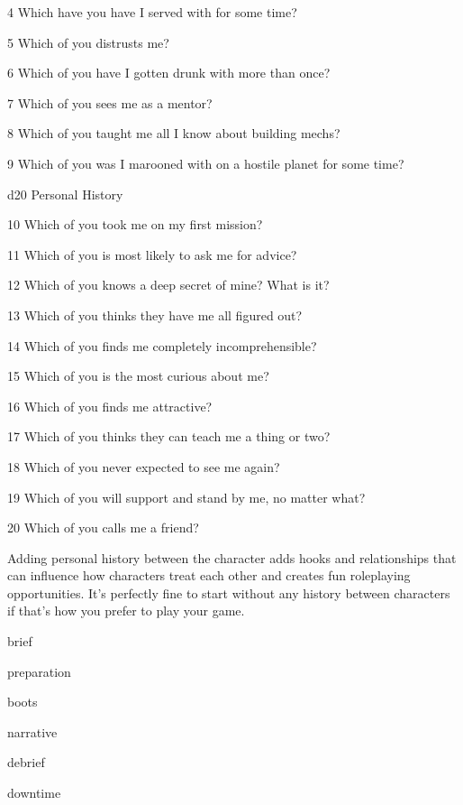  4         Which have you have I served with for some time?

 5         Which of you distrusts me?

 6         Which of you have I gotten drunk with more than once?

 7         Which of you sees me as a mentor?

 8         Which of you taught me all I know about building mechs?

 9         Which of you was I marooned with on a hostile planet for some time?




 d20       Personal	History

  10       Which of you took me on my first mission?

  11       Which of you is most likely to ask me for advice?

  12       Which of you knows a deep secret of mine? What is it?

  13       Which of you thinks they have me all figured out?

  14       Which of you finds me completely incomprehensible?

  15       Which of you is the most curious about me?

  16       Which of you finds me attractive?

  17       Which of you thinks they can teach me a thing or two?

  18       Which of you never expected to see me again?

  19       Which of you will support and stand by me, no matter what?

  20       Which of you calls me a friend?

Adding personal history between the character adds hooks and relationships that can influence
how characters treat each other and creates fun roleplaying opportunities. It’s perfectly fine to
start without any history between characters if that’s how you prefer to play your game.

{brief}

{preparation}

{boots}

{narrative}

{debrief}

{downtime}








